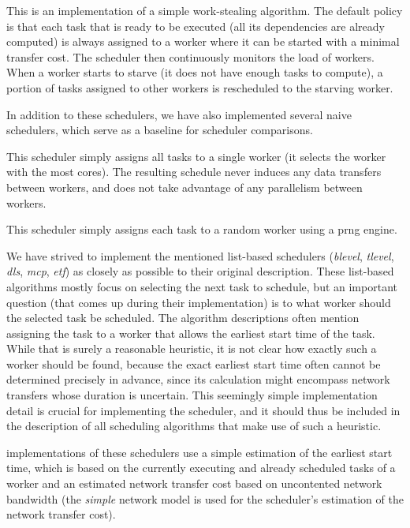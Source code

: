 \begin{description}[wide=0pt,itemsep=0pt,topsep=4pt]
	\item[ws]
		This is an implementation of a simple work-stealing algorithm. The default policy is that each task
		that is ready to be executed (all its dependencies are already computed) is always assigned to a
		worker where it can be started with a minimal transfer cost. The scheduler then continuously
		monitors the load of workers. When a worker starts to starve (it does not have enough tasks to
		compute), a portion of tasks assigned to other workers is rescheduled to the starving worker.
\end{description}

In addition to these schedulers, we have also implemented several naive schedulers, which serve as
a baseline for scheduler comparisons.

\begin{description}[wide=0pt]
	\item[single]
		This scheduler simply assigns all tasks to a single worker (it selects the worker with the most
		cores). The resulting schedule never induces any data transfers between workers, and does not take
		advantage of any parallelism between workers.
	\item[random]
		This scheduler simply assigns each task to a random worker using a \gls{prng} engine.
\end{description}

We have strived to implement the mentioned list-based schedulers (\emph{blevel},
\emph{tlevel}, \emph{dls}, \emph{mcp}, \emph{etf})
as closely as possible to their original description. These list-based algorithms mostly focus on
selecting the next task to schedule, but an important question (that comes up during their
implementation) is to what worker should the selected task be scheduled. The algorithm descriptions
often mention assigning the task to a worker that allows the earliest start time of the task. While
that is surely a reasonable heuristic, it is not clear how exactly such a worker should be found,
because the exact earliest start time often cannot be determined precisely in advance, since its
calculation might encompass network transfers whose duration is uncertain. This seemingly simple
implementation detail is crucial for implementing the scheduler, and it should thus be included in
the description of all scheduling algorithms that make use of such a heuristic.

\estee{} implementations of these schedulers use a simple estimation of the earliest
start time, which is based on the currently executing and already scheduled tasks of a worker and
an estimated network transfer cost based on uncontented network bandwidth (the
\emph{simple} network model is used for the scheduler's estimation of the network
transfer cost).


